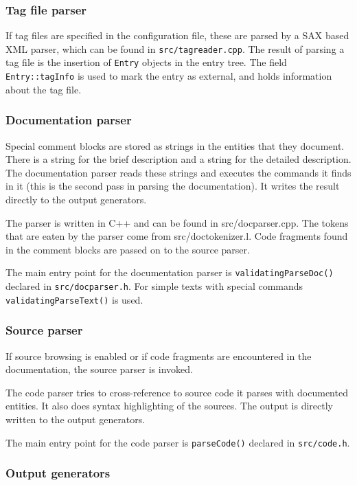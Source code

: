 \subsubsection*{Tag file parser}

If tag files are specified in the configuration file, these are parsed by a SAX based XML parser, which can be found in {\tt src/tagreader.cpp}. The result of parsing a tag file is the insertion of {\tt Entry} objects in the entry tree. The field {\tt Entry::tagInfo} is used to mark the entry as external, and holds information about the tag file.

\subsubsection*{Documentation parser}

Special comment blocks are stored as strings in the entities that they document. There is a string for the brief description and a string for the detailed description. The documentation parser reads these strings and executes the commands it finds in it (this is the second pass in parsing the documentation). It writes the result directly to the output generators.

The parser is written in C++ and can be found in src/docparser.cpp. The tokens that are eaten by the parser come from src/doctokenizer.l. Code fragments found in the comment blocks are passed on to the source parser.

The main entry point for the documentation parser is {\tt validatingParseDoc()} declared in {\tt src/docparser.h}. For simple texts with special commands {\tt validatingParseText()} is used.

\subsubsection*{Source parser}

If source browsing is enabled or if code fragments are encountered in the documentation, the source parser is invoked.

The code parser tries to cross-reference to source code it parses with documented entities. It also does syntax highlighting of the sources. The output is directly written to the output generators.

The main entry point for the code parser is {\tt parseCode()} declared in {\tt src/code.h}.

\subsubsection*{Output generators}

